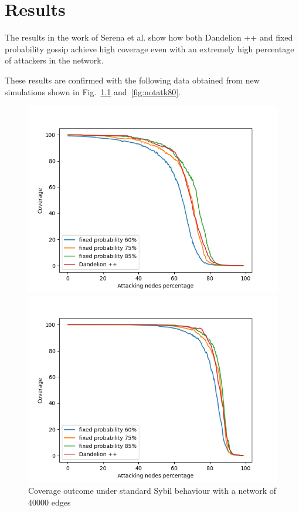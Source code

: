 \chapter{Results}
\label{sec:res}

The results in the work of Serena et al. show how both Dandelion ++ and fixed probability gossip achieve high coverage even with an extremely high percentage of attackers in the network\cite{lunes-dissemination}.

These results are confirmed with the following data obtained from new simulations shown in Fig.~\ref{fig:noatk40} and~\ref{fig:notatk80}.\par

    \begin{figure}[ht]
        \begin{minipage}[b]{0.5\linewidth}
            \includegraphics[width=1.1\textwidth]{pict/results/noatk-40.png}
			\centering 
			\caption{Coverage outcome under standard Sybil behaviour with a network of 40000 edges}
			\label{fig:noatk40}
        \end{minipage}
        \hspace{0.5cm}
        \begin{minipage}[b]{0.5\linewidth}
            \includegraphics[width=1.1\textwidth]{pict/results/noatk-80.png}

\end{minipage}
\end{figure}
